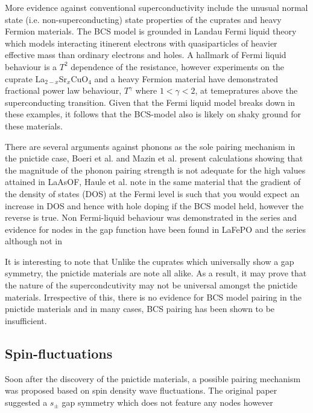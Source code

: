 More evidence against conventional superconductivity include the unusual normal state (i.e. non-superconducting) state properties of the cuprates and heavy Fermion materials. The BCS model is grounded in Landau Fermi liquid theory which models interacting itinerent electrons with quasiparticles of heavier effective mass than ordinary electrons and holes. A hallmark of Fermi liquid behaviour is a $T^2$ dependence of the resistance, however experiments on the cuprate La$_{2-x}$Sr$_{x}$CuO$_4$\cite{Cooper2009} and a heavy Fermion material\cite{Custers2003} have demonstrated fractional power law behaviour, $T^\gamma$ where $1 < \gamma < 2$, at temepratures above the superconducting transition. Given that the Fermi liquid model breaks down in these examples, it follows that the BCS-model also is likely on shaky ground for these materials.

There are several arguments against phonons as the sole pairing mechanism in the pnictide case, Boeri et al.\cite{Boeri2008} and Mazin et al.\cite{Mazin2008} present calculations showing that the magnitude of the phonon pairing strength is not adequate for the high \Tc values attained in LaAsOF, Haule et al.\cite{Haule2008} note in the same material that the gradient of the density of states (DOS) at the Fermi level is such that you would expect an increase in DOS and hence \Tc with hole doping if the BCS model held, however the reverse is true. Non Fermi-liquid behaviour was demonstrated in the \BaFePAs series\cite{Jiang2009,Kasahara2010} and evidence for nodes in the gap function have been found in LaFePO\cite{Fletcher2009} and the \BaFePAs series\cite{Zhang2011,Yamashita2011a,Suzuki2011} although not in %

It is interesting to note that Unlike the cuprates which universally show a \DxTwoyTwo gap symmetry, the pnictide materials are note all alike. As a result, it may prove that the nature of the supercondcutivity may not be universal amongst the pnictide materials. Irrespective of this, there is no evidence for BCS model pairing in the pnictide materials and in many cases, BCS pairing has been shown to be insufficient.


\subsection{Spin-fluctuations}

Soon after the discovery of the pnictide materials, a possible pairing mechanism was proposed based on spin density wave fluctuations. The original paper suggested a $s_{\pm}$ gap symmetry which does not feature any nodes however 

